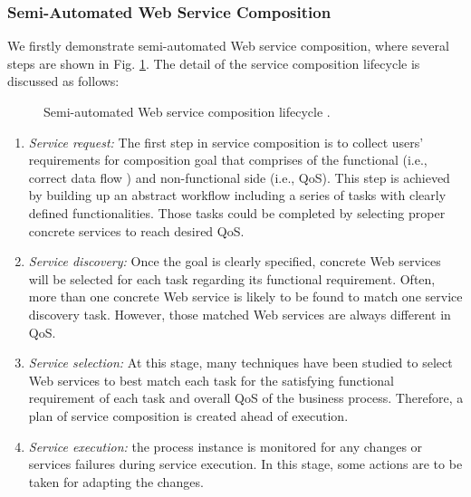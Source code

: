\subsubsection{Semi-Automated Web Service Composition}\label{lifecycle}
We firstly demonstrate semi-automated Web service composition, where several steps are shown in Fig. \ref{fig:lifecycle}. The detail of the service composition lifecycle is discussed as follows:

\begin{figure}
\centerline{
}
\caption{Semi-automated Web service composition lifecycle \cite{moghaddam2014service}.}
\label{fig:lifecycle}
\end{figure}

\begin{enumerate}
 \item \textit{Service request:} The first step in service composition is to collect users' requirements for composition goal that comprises of the functional (i.e., correct data flow ) and non-functional side (i.e., QoS). This step is achieved by building up an abstract workflow including a series of tasks with clearly defined functionalities. Those tasks could be completed by selecting proper concrete services to reach desired QoS. 
 \item \textit{Service discovery:} Once the goal is clearly specified, concrete Web services will be selected for each task regarding its functional requirement. Often, more than one concrete Web service is likely to be found to match one service discovery task. However, those matched Web services are always different in QoS.
 \item \textit{Service selection:} At this stage, many techniques have been studied to select Web services to best match each task for the satisfying functional requirement of each task and overall QoS of the business process. Therefore, a plan of service composition is created ahead of execution.
 \item \textit{Service execution:} the process instance is monitored for any changes or services failures during service execution. In this stage, some actions are to be taken for adapting the changes.
\end{enumerate}

